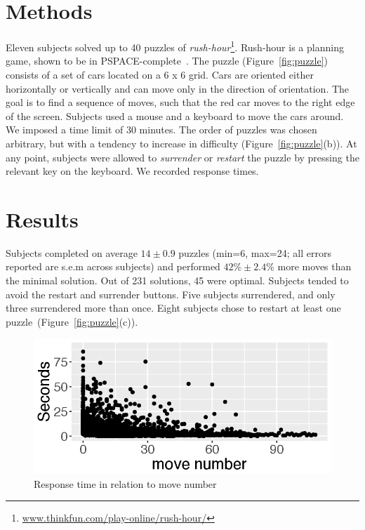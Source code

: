 \documentclass[10pt,letterpaper]{article}
\begin{document}
\section{Methods}
Eleven subjects solved up to 40 puzzles of \emph{rush-hour}\footnote{\url{www.thinkfun.com/play-online/rush-hour/}}. Rush-hour is a planning game, shown to be in PSPACE-complete~\cite{flake2002rush}. The puzzle (Figure~\ref{fig:puzzle}) consists of a set of cars located on a 6 x 6 grid. Cars are oriented either horizontally or vertically and can move only in the direction of orientation. The goal is to find a sequence of moves, such that the red car moves to the right edge of the screen. Subjects used a mouse and a keyboard to move the cars around. We imposed a time limit of 30 minutes. The order of puzzles was chosen arbitrary, but with a tendency to increase in difficulty (Figure~\ref{fig:puzzle}(b)). At any point, subjects were allowed to \emph{surrender} or \emph{restart} the puzzle by pressing the relevant key on the keyboard. We recorded response times. 


\section{Results}
Subjects completed on average $14\pm0.9$ puzzles (min=6, max=24; all errors reported are s.e.m across subjects) and performed $42\%\pm2.4\%$ more moves than the minimal solution. Out of 231 solutions, 45 were optimal. Subjects tended to avoid the restart and surrender buttons. Five subjects surrendered, and only three surrendered more than once. Eight subjects chose to restart at least one puzzle~(Figure~\ref{fig:puzzle}(c)).
\begin{figure}[t]
	\centering
	\includegraphics[width=0.7\linewidth]{p3_1}
	\caption{Response time in relation to move number}%
	\label{fig:rt}
\end{figure}
\end{document}
